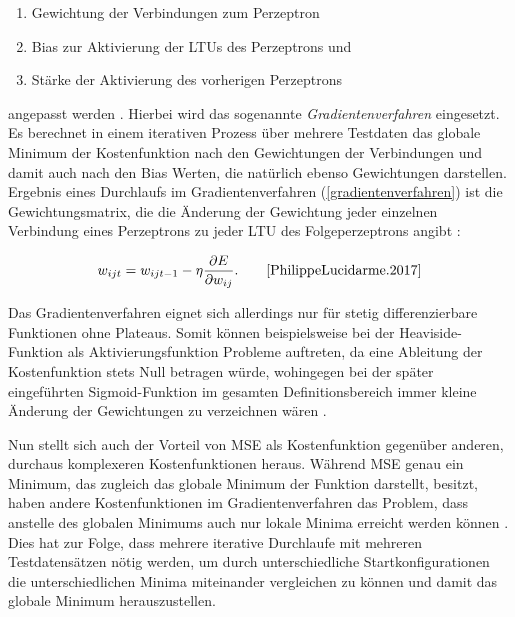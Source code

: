 \begin{enumerate}
	\item Gewichtung der Verbindungen zum Perzeptron
	\item Bias zur Aktivierung der LTUs des Perzeptrons und
	\item Stärke der Aktivierung des vorherigen Perzeptrons
\end{enumerate}

angepasst werden \cite{AurelienGeron.2018}. Hierbei wird das sogenannte \textit{Gradientenverfahren} eingesetzt. Es berechnet in einem iterativen Prozess über mehrere Testdaten das globale Minimum der Kostenfunktion nach den Gewichtungen der Verbindungen und damit auch nach den Bias Werten, die natürlich ebenso Gewichtungen darstellen. Ergebnis eines Durchlaufs im Gradientenverfahren (\ref{gradientenverfahren}) ist die Gewichtungsmatrix, die die Änderung der Gewichtung jeder einzelnen Verbindung eines Perzeptrons zu jeder LTU des Folgeperzeptrons angibt \cite{AurelienGeron.2018}:

\begin{equation} \label{gradientenverfahren}
w_{ijt} = w_{ijt-1} - \eta\frac{\partial E}{\partial w_{ij}}. \qquad\text{\cite{PhilippeLucidarme.2017}} 
\end{equation}

Das Gradientenverfahren eignet sich allerdings nur für stetig differenzierbare Funktionen ohne Plateaus. Somit können beispielsweise bei der Heaviside-Funktion als Aktivierungsfunktion Probleme auftreten, da eine Ableitung der Kostenfunktion stets Null betragen würde, wohingegen bei der später eingeführten Sigmoid-Funktion im gesamten Definitionsbereich immer kleine Änderung der Gewichtungen zu verzeichnen wären \cite{AurelienGeron.2018}.

Nun stellt sich auch der Vorteil von MSE als Kostenfunktion gegenüber anderen, durchaus komplexeren Kostenfunktionen heraus. Während MSE genau ein Minimum, das zugleich das globale Minimum der Funktion darstellt, besitzt, haben andere Kostenfunktionen im Gradientenverfahren das Problem, dass anstelle des globalen Minimums auch nur lokale Minima erreicht werden können \cite{AurelienGeron.2018}. Dies hat zur Folge, dass mehrere iterative Durchlaufe mit mehreren Testdatensätzen nötig werden, um durch unterschiedliche Startkonfigurationen die unterschiedlichen Minima miteinander vergleichen zu können und damit das globale Minimum herauszustellen.

